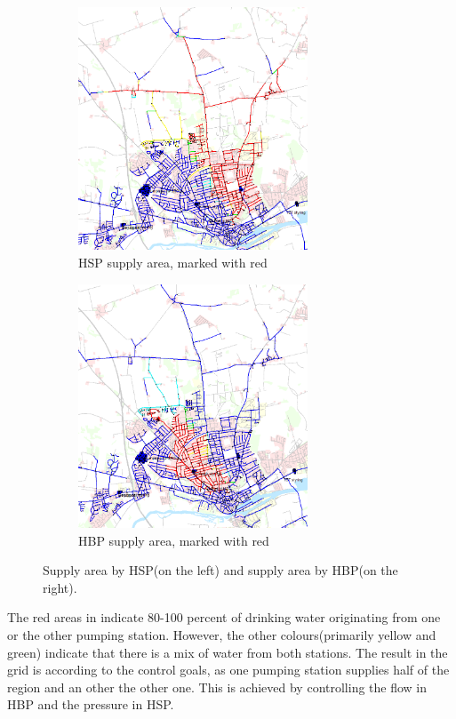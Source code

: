 \begin{figure}[H]
\centering
\begin{subfigure}{.49\textwidth}
\centering
  \includegraphics[width=0.75\textwidth]{report/pictures/HBP_HSP_distribution}
  \caption{HSP supply area, marked with red}
  \label{fig:HSP_HBP_EPA1}
\end{subfigure}
\begin{subfigure}{.49\textwidth}
\centering
  \includegraphics[width=0.75\textwidth]{report/pictures/HBP_HSP_distribution1}
  \caption{HBP supply area, marked with red}
  \label{fig:HSP_HBP_EPA2}
\end{subfigure}
\caption{Supply area by HSP(on the left) and supply area by HBP(on the right)\cite{verdo_doc}.}
\label{fig:HSP_HBP_EPA}
\end{figure}

\vspace{-3mm}

The red areas in  indicate 80-100 percent of drinking water originating from one or the other pumping station. However, the other colours(primarily yellow and green) indicate that there is a mix of water from both stations. The result in the grid is according to the control goals, as one pumping station supplies half of the region and an other the other one. This is achieved by controlling the flow in HBP and the pressure in HSP. 
